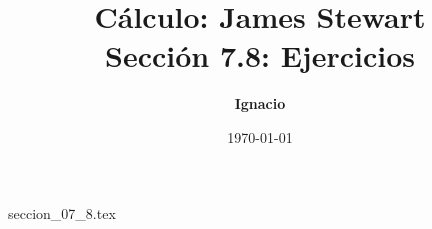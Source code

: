 \documentclass[11pt,spanish,oneside]{report}
\title{\textbf{Cálculo: James Stewart} \\ \Large Sección 7.8: Ejercicios}
\author{\textbf{Ignacio}}
\date{\today}
\begin{document}
\maketitle

{seccion_07_8.tex}
\end{document}
